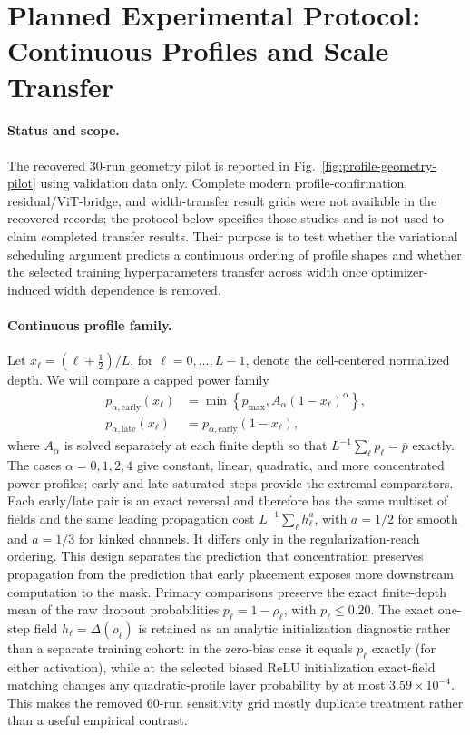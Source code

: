 \section{Planned Experimental Protocol: Continuous Profiles and Scale Transfer}
\label{sec:planned_profile_mup}

\paragraph{Status and scope.}
The recovered 30-run geometry pilot is reported in Fig.~\ref{fig:profile-geometry-pilot} using validation data only. Complete modern profile-confirmation, residual/ViT-bridge, and width-transfer result grids were not available in the recovered records; the protocol below specifies those studies and is not used to claim completed transfer results. Their purpose is to test whether the variational scheduling argument predicts a continuous ordering of profile shapes and whether the selected training hyperparameters transfer across width once optimizer-induced width dependence is removed.

\paragraph{Continuous profile family.}
Let \(x_\ell=(\ell+\tfrac12)/L\), for \(\ell=0,\ldots,L-1\), denote the cell-centered normalized depth. We will compare a capped power family
\begin{equation}
 \begin{aligned}
 p_{\alpha,\mathrm{early}}(x_\ell)
   &=\min\!\left\{p_{\max},A_\alpha(1-x_\ell)^\alpha\right\},\\
 p_{\alpha,\mathrm{late}}(x_\ell)
   &=p_{\alpha,\mathrm{early}}(1-x_\ell),
 \end{aligned}
 \label{eq:planned_power_profiles}
\end{equation}
where \(A_\alpha\) is solved separately at each finite depth so that \(L^{-1}\sum_\ell p_\ell=\bar p\) exactly. The cases \(\alpha=0,1,2,4\) give constant, linear, quadratic, and more concentrated power profiles; early and late saturated steps provide the extremal comparators. Each early/late pair is an exact reversal and therefore has the same multiset of fields and the same leading propagation cost \(L^{-1}\sum_\ell h_\ell^a\), with \(a=1/2\) for smooth and \(a=1/3\) for kinked channels. It differs only in the regularization-reach ordering. This design separates the prediction that concentration preserves propagation from the prediction that early placement exposes more downstream computation to the mask. Primary comparisons preserve the exact finite-depth mean of the raw dropout probabilities \(p_\ell=1-\rho_\ell\), with \(p_\ell\leq0.20\). The exact one-step field \(h_\ell=\Delta(\rho_\ell)\) is retained as an analytic initialization diagnostic rather than a separate training cohort: in the zero-bias case it equals \(p_\ell\) exactly (for either activation), while at the selected biased ReLU initialization exact-field matching changes any quadratic-profile layer probability by at most \(3.59\times10^{-4}\). This makes the removed 60-run sensitivity grid mostly duplicate treatment rather than a useful empirical contrast.


